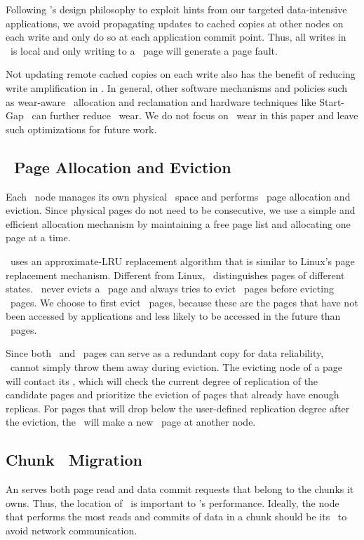 Following \hotpot's design philosophy to exploit hints from our targeted data-intensive applications,
we avoid propagating updates to cached copies at other nodes on each write and only do so at each application commit point.
Thus, all writes in \hotpot\ is local and only writing to a \committed\ page will generate a page fault.

Not updating remote cached copies on each write also has the benefit of reducing write amplification in \nvm.
In general, other software mechanisms and policies such as wear-aware \nvm\ allocation and reclamation 
and hardware techniques like Start-Gap~\cite{start-gap-micro09}
can further reduce \nvm\ wear.
We do not focus on \nvm\ wear in this paper and leave such optimizations for future work.

\subsection{\nvm\ Page Allocation and Eviction}
\label{sec:eviction}
Each \hotpot\ node manages its own physical \nvm\ space and performs \nvm\ page allocation and eviction.
Since physical pages do not need to be consecutive,
we use a simple and efficient allocation mechanism by maintaining a free page list
and allocating one page at a time.

\hotpot\ uses an approximate-LRU replacement algorithm that is similar to Linux's page replacement mechanism.
Different from Linux,
\hotpot\ distinguishes pages of different states.
\hotpot\ never evicts a \dirty\ page
and always tries to evict \redundant\ pages before evicting \committed\ pages.
We choose to first evict \redundant\ pages, 
because these are the pages that have not been accessed by applications
and less likely to be accessed in the future than \committed\ pages. %

Since both \redundant\ and \committed\ pages can serve as a redundant copy
for data reliability, \hotpot\ cannot simply throw them away during eviction.
The evicting node of a page will contact its \on{}, 
which will check the current degree of replication of the candidate pages 
and prioritize the eviction of pages that already have enough replicas. 
For pages that will drop below the user-defined replication degree after the eviction, 
the \on\ will make a new \redundant\ page at another node. %

\subsection{Chunk \on\ Migration}
\label{sec:migration}
An \on{} serves both page read and data commit requests that belong to the chunks it owns.
Thus, the location of \on\ is important to \hotpot's performance.
Ideally, the node that performs the most reads and commits of data in a chunk 
should be its \on\ to avoid network communication.

